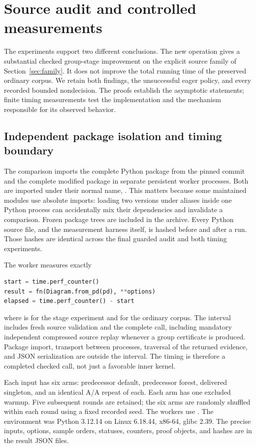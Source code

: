 \section{Source audit and controlled measurements}
\label{sec:experiments}

The experiments support two different conclusions. The new operation gives
a substantial checked group-stage improvement on the explicit source family
of Section~\ref{sec:family}. It does not improve the total running time of the
preserved ordinary corpus. We retain both findings, the unsuccessful eager
policy, and every recorded bounded nondecision. The proofs establish the
asymptotic statements; finite timing measurements test the implementation
and the mechanism responsible for its observed behavior.

\subsection{Independent package isolation and timing boundary}

The comparison imports the complete Python package from the pinned commit
and the complete modified package in separate persistent worker processes.
Both are imported under their normal name, . This matters
because some maintained modules use absolute imports: loading two versions
under aliases inside one Python process can accidentally mix their
dependencies and invalidate a comparison. Frozen package trees are included
in the archive. Every Python source file, and the measurement harness itself,
is hashed before and after a run. Those hashes are identical across the
final guarded audit and both timing experiments.

The worker measures exactly
\begin{lstlisting}[language=Python]
start = time.perf_counter()
result = fn(Diagram.from_pd(pd), **options)
elapsed = time.perf_counter() - start
\end{lstlisting}
where  is  for the stage experiment and
 for the ordinary corpus. The interval includes fresh source
validation and the complete call, including mandatory independent compressed
source replay whenever a group certificate is produced. Package import,
transport between processes, traversal of
the returned evidence, and JSON serialization are outside the interval.
The timing is therefore a completed checked call, not just a favorable
inner kernel.

Each input has six arms: predecessor default, predecessor forest, delivered
singleton, and an identical A/A repeat of each. Each arm has one excluded
warmup. Five subsequent rounds are retained; the six arms are randomly
shuffled within each round using a fixed recorded seed. The workers use
. The environment was Python 3.12.14 on
Linux 6.18.44, x86-64, glibc 2.39. The precise inputs, options, sample orders,
statuses, counters, proof objects, and hashes are in the result JSON files.

